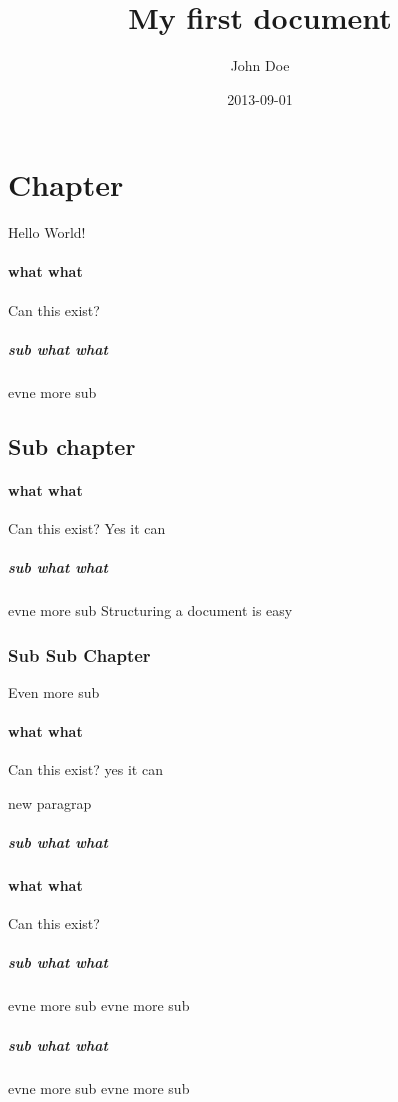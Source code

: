 \documentclass{article}
\title{My first document}
\date{2013-09-01}
\author{John Doe}
\begin{document}

\maketitle

\newpage


\section{Chapter }

Hello World!

\paragraph { what what }

Can this exist?

\subparagraph { sub what what }

evne more sub

\subsection {Sub chapter }

\paragraph { what what }

Can this exist?
Yes it can

\subparagraph { sub what what }

evne more sub
Structuring a document is easy

\subsubsection {Sub Sub Chapter }

Even more sub

\paragraph { what what }

Can this exist?
yes it can

new paragrap

\subparagraph { sub what what }

\paragraph { what what }

Can this exist?

\subparagraph { sub what what }

evne more sub
evne more sub
\subparagraph { sub what what }

evne more sub
evne more sub
\end{document}
